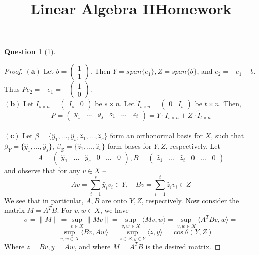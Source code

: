 \documentclass[11pt]{article}
\title{\vspace{-50pt}
\Huge \name
\\\vspace{20pt}
\huge Linear Algebra II\hfill Homework \hw}
\author{}
\date{}
\theoremstyle{quest}
\newtheorem*{question}{Question}
\begin{document}
\maketitle

\begin{question}[1]
\end{question}
\begin{proof}
$\mathbf{(a)}$ Let $b = \begin{pmatrix}
1 \\
1
\end{pmatrix}$. Then $Y = span \{e_1\}, Z = span \{b\}$, and $e_2 = -e_1 + b$. Thus $Pe_2 = -e_1 = - \begin{pmatrix}
1 \\
0
\end{pmatrix} $.
\\$\mathbf{(b)}$ Let $I_{s \times n} = \begin{pmatrix}
I_s & 0
\end{pmatrix} $ be $s \times n$. Let $\tilde{I}_{t \times n} = \begin{pmatrix}
0 & I_t
\end{pmatrix} $ be $t \times n$. Then,
$$P = \begin{pmatrix}
y_1 & \ldots & y_s & z_1 & \ldots & z_t
\end{pmatrix}  = Y \cdot I_{s \times n}  + Z \cdot \tilde{I}_{t \times n} $$
\\$\mathbf{(c)}$ Let $\beta = \{\hat{y}_1, \ldots, \hat{y}_s, \hat{z}_1, \ldots, \hat{z}_s\}$ form an orthonormal basis for $X$, such that $\beta_Y = \{\hat{y}_1, \ldots, \hat{y}_s\}$, $\beta_Z = \{\hat{z}_1, \ldots, \hat{z}_s\}$ form bases for $Y, Z$, respectively. Let
$$A = \begin{pmatrix}
\hat{y}_1 & \ldots & \hat{y}_s & 0 & \ldots & 0
\end{pmatrix}, B = \begin{pmatrix}
\hat{z}_1 & \ldots & \hat{z}_t & 0 & \ldots & 0
\end{pmatrix} $$
and observe that for any $v \in X$ --
$$Av = \sum_{i=1}^s \hat{y}_i v_i \in Y,\ \ \ \ Bv = \sum_{i=1}^t \hat{z}_i v_i \in Z$$
We see that in particular, $A, B$ are onto $Y, Z$, respectively.
Now consider the matrix $M = A^TB$. For $v, w \in X$, we have --
$$\sigma = \|M\| = \sup_{v \in X} \|Mv\| = \sup_{v,w \in X} \langle Mv, w \rangle = \sup_{v,w \in X} \langle A^TB v, w \rangle = $$ $$= \sup_{v,w \in X} \langle B v, A w \rangle = \sup_{z \in Z, y \in Y} \langle z, y \rangle = \cos \theta(Y, Z)$$
Where $z= Bv, y = Aw$, and where $M = A^TB$ is the desired matrix.
\end{proof}
\end{document}
